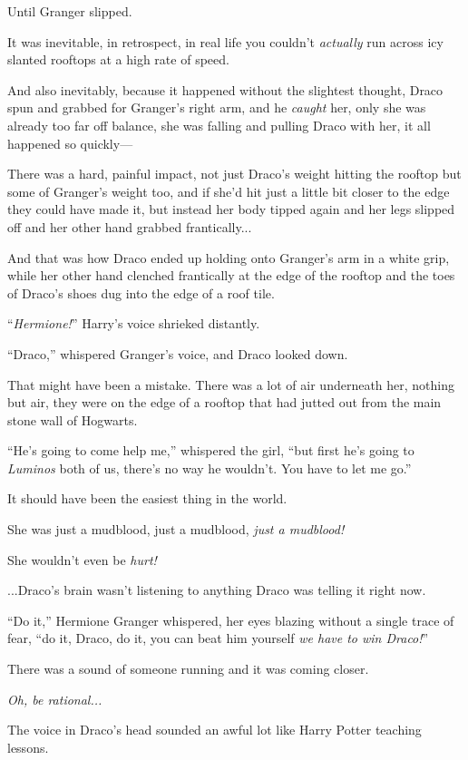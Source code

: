 Until Granger slipped.

It was inevitable, in retrospect, in real life you couldn’t \emph{actually} run across icy slanted rooftops at a high rate of speed.

And also inevitably, because it happened without the slightest thought, Draco spun and grabbed for Granger’s right arm, and he \emph{caught} her, only she was already too far off balance, she was falling and pulling Draco with her, it all happened so quickly—

There was a hard, painful impact, not just Draco’s weight hitting the rooftop but some of Granger’s weight too, and if she’d hit just a little bit closer to the edge they could have made it, but instead her body tipped again and her legs slipped off and her other hand grabbed frantically...

And that was how Draco ended up holding onto Granger’s arm in a white grip, while her other hand clenched frantically at the edge of the rooftop and the toes of Draco’s shoes dug into the edge of a roof tile.

“\emph{Hermione!}” Harry’s voice shrieked distantly.

“Draco,” whispered Granger’s voice, and Draco looked down.

That might have been a mistake. There was a lot of air underneath her, nothing but air, they were on the edge of a rooftop that had jutted out from the main stone wall of Hogwarts.

“He’s going to come help me,” whispered the girl, “but first he’s going to \emph{Luminos} both of us, there’s no way he wouldn’t. You have to let me go.”

It should have been the easiest thing in the world.

She was just a mudblood, just a mudblood, \emph{just a mudblood!}

She wouldn’t even be \emph{hurt!}

...Draco’s brain wasn’t listening to anything Draco was telling it right now.

“Do it,” Hermione Granger whispered, her eyes blazing without a single trace of fear, “do it, Draco, do it, you can beat him yourself \emph{we have to win Draco!}”

There was a sound of someone running and it was coming closer.

\emph{Oh, be rational...}

The voice in Draco’s head sounded an awful lot like Harry Potter teaching lessons.

